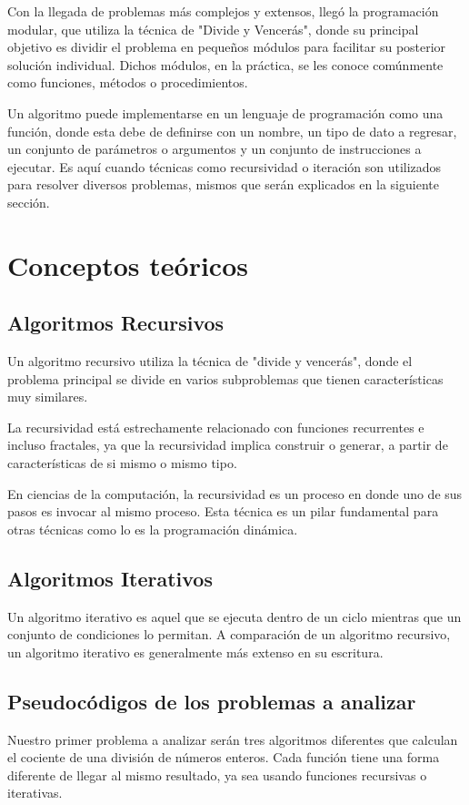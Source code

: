 \documentclass[12pt,twoside]{article}
\begin{document}
    Con la llegada de problemas más complejos y extensos, llegó la programación modular, que utiliza la técnica de "Divide y Vencerás", donde su principal objetivo es dividir el problema en pequeños módulos para facilitar su posterior solución individual. Dichos módulos, en la práctica, se les conoce comúnmente como funciones, métodos o procedimientos.
    
    Un algoritmo puede implementarse en un lenguaje de programación como una función, donde esta debe de definirse con un nombre, un tipo de dato a regresar, un conjunto de parámetros o argumentos y un conjunto de instrucciones a ejecutar. Es aquí cuando técnicas como recursividad o iteración son utilizados para resolver diversos problemas, mismos que serán explicados en la siguiente sección.
    
    
    
    \section{Conceptos te\'oricos}
    
    
        \subsection{Algoritmos Recursivos}
        Un algoritmo recursivo utiliza la técnica de "divide y vencerás", donde el problema principal se divide en varios subproblemas que tienen características muy similares.
        
        La recursividad está estrechamente relacionado con funciones recurrentes e incluso fractales, ya que la recursividad implica construir o generar, a partir de características de si mismo o mismo tipo.
        
        En ciencias de la computación, la recursividad es un proceso en donde uno de sus pasos es invocar al mismo proceso. Esta técnica es un pilar fundamental para otras técnicas como lo es la programación dinámica.
        
        \subsection{Algoritmos Iterativos}
        Un algoritmo iterativo es aquel que se ejecuta dentro de un ciclo mientras que un conjunto de condiciones lo permitan. A comparación de un algoritmo recursivo, un algoritmo iterativo es generalmente más extenso en su escritura.
        
    \subsection{Pseudocódigos de los problemas a analizar}
    Nuestro primer problema a analizar serán tres algoritmos diferentes que calculan el cociente de una división de números enteros. Cada función tiene una forma diferente de llegar al mismo resultado, ya sea usando funciones recursivas o iterativas.
    
\end{document}
